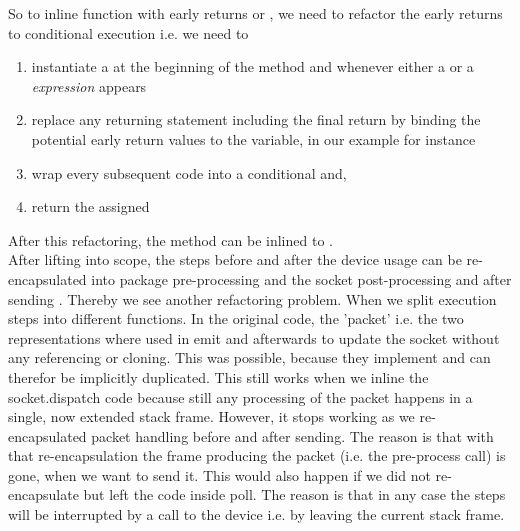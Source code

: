  So to inline function with early returns or , we need to refactor the early returns to conditional execution i.e. we need to 
 \begin{enumerate}
     \item instantiate a  at the beginning of the method and whenever either a  or a \emph{expression} appears
     \item replace any returning statement including the final return by binding the potential early return values to the  variable, in our example for instance\\ 
     \item wrap every subsequent code into a conditional and, 
     \item return the assigned 
 \end{enumerate}
 
After this refactoring, the  method can be inlined to . \\

After lifting  into scope, the steps before and after the device usage can be re-encapsulated into package pre-processing  and the socket post-processing and after sending . Thereby we see another refactoring problem. When we split execution steps into different functions. In the original code, the 'packet' i.e. the two representations where used in emit and afterwards to update the socket without any referencing or cloning. This was possible, because they implement  and can therefor be implicitly duplicated. This still works when we inline the socket.dispatch code because still any processing of the packet happens in a single, now extended stack frame. However, it stops working as we re-encapsulated packet handling before and after sending. The reason is that with that re-encapsulation the frame producing the packet (i.e. the pre-process call) is gone, when we want to send it. This would also happen if we did not re-encapsulate but left the code inside poll. The reason is that in any case the steps will be interrupted by a call to the device i.e. by leaving the current stack frame.\\

